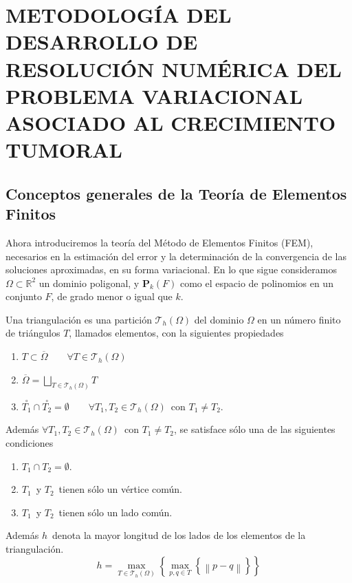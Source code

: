 \chapter{\MakeUppercase{Metodología del desarrollo de  resolución numérica del problema variacional asociado al crecimiento tumoral}}
\thispagestyle{fancy}
\section{Conceptos generales de la Teoría de Elementos Finitos}
Ahora introduciremos la teoría del Método de Elementos Finitos (FEM),
necesarios en la estimación del error y la determinación de la
convergencia de las soluciones aproximadas, en su forma variacional. En lo que sigue
consideramos $\Omega \subset \mathbb{R}^{2}$ un dominio poligonal,
y $\mathbf{P}_{k}\left( F\right) $ como el espacio de polinomios
en un conjunto $F$, de grado menor o igual que $k$.
\begin{defi}[Triangulación]
	\label{cond_trian}  Una triangulación es una partición $
	\mathcal{T}_{h}\left( \Omega \right) $ del dominio $\Omega $ en un
	número finito de triángulos $T$, llamados elementos, con la
	siguientes propiedades
	\begin{enumerate}
		\item  $T\subset \overline{\Omega }\qquad \forall T\in \mathcal{T}_{h}\left( \Omega
		\right) $
		\item  $\overline{\Omega }=\bigsqcup\limits_{T\in \mathcal{T}_{h}\left(
			\Omega \right) }T$
		\item  $\stackrel{\circ }{T_{1}}\cap \stackrel{\circ }{T_{2}}=\emptyset
		\qquad \forall T_{1},T_{2}\in \mathcal{T}_{h}\left( \Omega \right) $\ con $%
		T_{1}\neq T_{2}.$
	\end{enumerate}
	Además $\forall T_{1},T_{2}\in \mathcal{T}_{h}\left( \Omega \right) $\
	con $T_{1}\neq T_{2}$, se satisface sólo una de las siguientes
	condiciones
	\begin{enumerate}
		\item  $T_{1}\cap T_{2}=\emptyset$.
		\item  $T_{1}$\ y $T_{2}$\ tienen sólo un vértice común.
		\item  $T_{1}$\ y $T_{2}$\ tienen sólo un lado común.
	\end{enumerate}
	Además $h$\ denota la mayor longitud de los lados de los elementos de la
	triangulación.
	\[
	h=\max_{T\in \mathcal{T}_{h}\left( \Omega \right)
	}\left\{ \max_{p,q\in T}\left\{ \left\|
	p-q\right\| \right\} \right\}
	\]
\end{defi}
